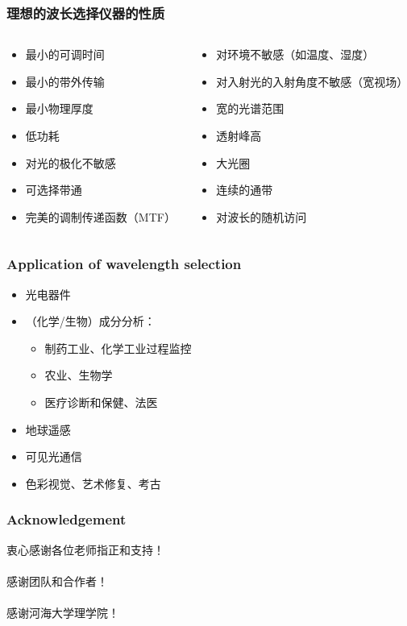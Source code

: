 \begin{frame}[c]
    \frametitle{理想的波长选择仪器的性质}
    \begin{columns}
        \begin{column}{.5\textwidth}
            \begin{itemize}
                \item 最小的可调时间
                \item 最小的带外传输
                \item 最小物理厚度
                \item 低功耗
                \item 对光的极化不敏感
                \item 可选择带通
                \item 完美的调制传递函数（MTF）
            \end{itemize}
        \end{column}
        \begin{column}{.5\textwidth}
            \begin{itemize}
                \item 对环境不敏感（如温度、湿度）
                \item 对入射光的入射角度不敏感（宽视场）
                \item 宽的光谱范围
                \item 透射峰高
                \item 大光圈
                \item 连续的通带
                \item 对波长的随机访问
            \end{itemize}
        \end{column}
    \end{columns}
\end{frame}

\begin{frame}[c]
    \frametitle{Application of wavelength selection}
    \begin{itemize}
        \item 光电器件
        \item （化学/生物）成分分析：\begin{itemize}
                  \item 制药工业、化学工业过程监控
                  \item 农业、生物学
                  \item 医疗诊断和保健、法医
              \end{itemize}
        \item 地球遥感
        \item 可见光通信
        \item 色彩视觉、艺术修复、考古
    \end{itemize}
\end{frame}

\begin{frame}[c]
    \frametitle{Acknowledgement}
    \Large{\begin{center}
            衷心感谢各位老师指正和支持！\\
            ~\\
            感谢团队和合作者！\\
            ~\\
            感谢河海大学理学院！\\
        \end{center}}
\end{frame}

\printindex
